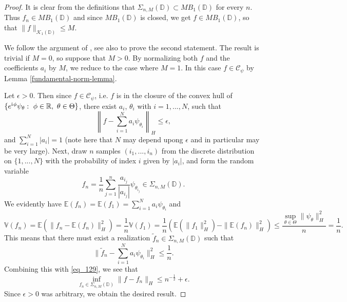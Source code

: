 \begin{proof}
 It is clear from the definitions that $\Sigma_{n,M}(\mathbb{D}) \subset MB_1(\mathbb{D})$ for every $n$. Thus $f_n\in MB_1(\mathbb{D})$ and since $MB_1(\mathbb{D})$ is closed, we get $f\in MB_1(\mathbb{D})$, so that $\|f\|_{\mathcal{K}_1(\mathbb{D})} \leq M$.


 We follow the argument of \cite{barron1993universal}, see also \cite{jones1992simple,pisier1981remarques} to prove the second statement. The result is trivial if $M = 0$, so suppose that $M > 0$. By normalizing both $f$ and the coefficients $a_i$  by $M$, we reduce to the case where $M = 1$. In this case $f\in \mathcal{C}_\psi$ by Lemma \ref{fundamental-norm-lemma}.

  Let $\epsilon > 0$. Then since $f\in \mathcal{C}_\psi$, i.e. $f$ is in the closure of the convex hull of $\{e^{{\mathrm{i}\mkern1mu}\phi}\psi_\theta:~\phi\in \mathbb{R},~\theta\in\Theta\}$, there exist $a_i$, $\theta_i$ with $i=1,...,N$, such that
 \begin{equation}\label{eq_129}
  \left\|f - \sum_{i=1}^Na_i\psi_{\theta_i}\right\|_H \leq \epsilon,
 \end{equation}
 and $\sum_{i=1}^N |a_i| = 1$ (note here that $N$ may depend upong $\epsilon$ and in particular may be very large). Next, draw $n$ samples $(i_1,...,i_n)$ from the discrete distribution on $\{1,...,N\}$ with the probability of index $i$ given by $|a_i|$, and form the random variable
\begin{equation}
 f_n = \frac{1}{n}\sum_{j=1}^n \frac{a_{i_j}}{|a_{i_j}|}\psi_{\theta_{i_j}} \in \Sigma_{n,M}(\mathbb{D}).
\end{equation}
We evidently have $\mathbb{E}(f_n) = \mathbb{E}(f_1) = \sum_{i=1}^Na_i\psi_{\theta_i}$ and $$\mathbb{V}(f_n) = \mathbb{E}(\|f_n-\mathbb{E}(f_n)\|_H^2) = \frac{1}{n}\mathbb{V}(f_1) = \frac{1}{n}(\mathbb{E}(\|f_1\|_H^2) - \|\mathbb{E}(f_n)\|_H^2)\leq \frac{\sup_{\theta\in \Theta} \|\psi_\theta\|^2_H}{n} = \frac{1}{n}.$$ 
This means that there must exist a realization $\tilde{f}_n\in\Sigma_{n,M}(\mathbb{D})$ such that
\begin{equation}
 \|\tilde{f}_n - \sum_{i=1}^Na_i\psi_{\theta_i}\|_H^2 \leq \frac{1}{n}.
\end{equation}
Combining this with \eqref{eq_129}, we see that
\begin{equation}
 \inf_{f_n\in\Sigma_{n,M}(\mathbb{D})} \|f-f_n\|_H \leq n^{-\frac{1}{2}} + \epsilon.
\end{equation}
Since $\epsilon > 0$ was arbitrary, we obtain the desired result.
\end{proof}


